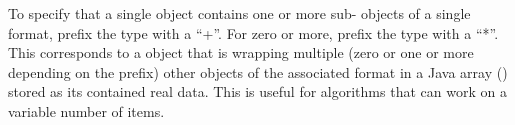 To specify that a single  object contains one or more
sub- objects of a single format, prefix the type with a ``+''. For
zero or more, prefix the type with a ``*''. This corresponds to a 
object that is wrapping multiple (zero or one or more depending on the prefix)
other  objects of the associated format in a Java array
() stored as its contained real data. This is useful for
algorithms that can work on a variable number of  items.
